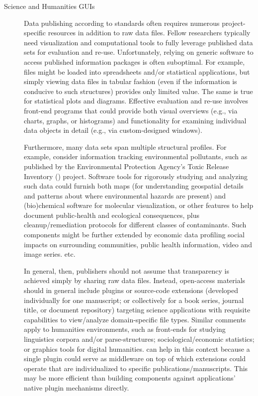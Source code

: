 \documentclass[11pt]{article}
\begin{document}
{\begin{description}
\item[Science and Humanities GUIs]   Data publishing 
according to \FAIRsharing{} standards often requires 
numerous project-specific resources in addition 
to raw data files.  Fellow researchers typically 
need visualization and computational tools to 
fully leverage published data sets for 
evaluation and re-use.  Unfortunately, relying on generic 
software to access published information packages is often 
suboptimal.  For example, \CSV{} files might be 
loaded into spreadsheets and/or statistical applications, 
but simply viewing data files in tabular fashion 
(even if the information is conducive to such structures) 
provides only limited value.  The same is true for 
statistical plots and diagrams.  Effective evaluation 
and re-use involves front-end programs that could provide 
both visual overviews (e.g., via charts, graphs, or histograms) 
and functionality for examining individual data objects 
in detail (e.g., via custom-designed \GUI{} windows).

\pseudoIndent{}  Furthermore, many data sets span multiple 
structural profiles.  For example, consider information 
tracking environmental pollutants, such as published 
by the Environmental Protection Agency's 
Toxic Release Inventory (\TRI{}) project.
Software tools for rigorously studying and analyzing such data could 
furnish both \GIS{} maps (for understanding 
geospatial details and patterns about where environmental 
hazards are present) and (bio)chemical software 
for molecular visualization, or other features to 
help document public-health and eco\-logical 
consequences, plus cleanup/remediation protocols for 
different classes of contaminants.  Such components 
might be further extended by economic data 
profiling social impacts on surrounding communities, 
public health information, video and image series. etc.

\pseudoIndent{}  In general, then, publishers should not 
assume that \FAIR{} transparency is achieved simply by 
sharing raw data files.  Instead, open-access materials should 
in general include plugins or source-code extensions (developed 
individually for one manuscript; or collectively 
for a book series, journal title, or document repository) 
targeting science applications with requisite capabilities 
to view/analyze domain-specific file types.  Similar 
comments apply to humanities environments, such as 
front-ends for studying linguistics corpora and/or 
parse-structures; sociological/economic 
statistics; or graphics tools for digital humanities.
\lPacTk{} can help in this context 
because a single \PacTk{} plugin could serve as middleware 
on top of which extensions could operate that are individualized 
to specific publications/manuscripts.  This may be more 
efficient than building components against applications' 
native plugin mechanisms directly. 

\end{description}

}
\end{document}
